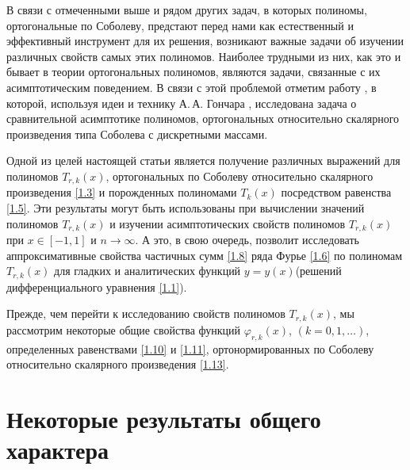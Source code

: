    В связи с отмеченными выше и рядом других  задач, в которых полиномы, ортогональные по Соболеву, предстают перед нами как естественный и эффективный инструмент для их решения, возникают важные задачи об изучении различных  свойств самых этих полиномов. Наиболее трудными из них, как это и бывает в теории ортогональных полиномов, являются задачи, связанные с их асимптотическим поведением.   В связи с этой проблемой  отметим  работу
\cite{Lopez1995}, в которой, используя  идеи и технику А.\,А. Гончара \cite{Gonchar1975}, исследована задача о сравнительной асимптотике полиномов, ортогональных относительно скалярного произведения типа  Соболева с дискретными массами.

Одной из целей настоящей статьи является получение различных выражений для полиномов $T_{r,k}(x)$, ортогональных по Соболеву относительно скалярного произведения \eqref{1.3} и порожденных полиномами  $T_{k}(x)$ посредством  равенства \eqref{1.5}. Эти результаты могут быть использованы при вычислении значений полиномов  $T_{r,k}(x)$ и изучении асимптотических свойств полиномов $T_{r,k}(x)$ при $x\in[-1,1]$ и $n\to\infty$. А это, в свою очередь, позволит исследовать аппроксимативные свойства частичных сумм \eqref{1.8} ряда Фурье \eqref{1.6} по полиномам $T_{r,k}(x)$ для гладких и аналитических функций $y=y(x) $(решений дифференциального уравнения \eqref{1.1}).

Прежде, чем  перейти к исследованию свойств полиномов $T_{r,k}(x)$, мы рассмотрим некоторые общие свойства  функций $\varphi_{r,k}(x)$, $(k=0,1,\ldots)$, определенных равенствами \eqref{1.10} и \eqref{1.11},  ортонормированных по Соболеву относительно скалярного произведения \eqref{1.13}.
\section{Некоторые результаты общего характера }

